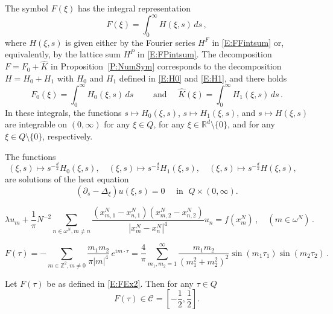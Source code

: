 \documentclass[10pt,a4paper]{amsart}
\let\hat=\widehat
\newcommand\R{{\mathbb R}}
\newcommand\Z{{\mathbb Z}}
\newcommand\cC{{\mathcal{C}}}
\begin{document}
\begin{proposition}
 \label{P:FInt}
 The symbol $F(\xi)$ has the integral representation
\begin{equation}
\label{E:F=intH}
 F(\xi) = \int_{0}^{\infty} H(\xi,s)\,ds\,,
\end{equation}
where $H(\xi,s)$ is given either by the Fourier series $H^{F}$ in \eqref{E:FFintsum} or, equivalently, by the lattice sum $H^{P}$ in \eqref{E:FPintsum}.  
The decomposition $F=F_{0}+\hat K$ in Proposition~\ref{P:NumSym} corresponds to the decomposition $H=H_{0}+H_{1}$ with $H_{0}$ and $H_{1}$ defined in \eqref{E:H0} and \eqref{E:H1}, and there holds
\begin{equation}
\label{E:F01Int}
F_{0}(\xi) = \int_{0}^{\infty} H_{0}(\xi,s)\,ds \qquad
\mbox{ and }\quad
\hat K(\xi) = \int_{0}^{\infty} H_{1}(\xi,s)\,ds \,.
\end{equation}
In these integrals, the functions $s\mapsto H_{0}(\xi,s)$, $s\mapsto H_{1}(\xi,s)$, and $s\mapsto H(\xi,s)$ are integrable on $(0,\infty)$ for any $\xi\in Q$, for any $\xi\in\R^{d}\setminus\{0\}$, and for any $\xi\in Q\setminus\{0\}$, respectively.
\end{proposition}

\begin{lemma}
The functions
 \label{L:heat}
$$
 (\xi,s)\mapsto s^{-\frac d2}H_{0}(\xi,s),\quad
 (\xi,s)\mapsto s^{-\frac d2}H_{1}(\xi,s),\quad
 (\xi,s)\mapsto s^{-\frac d2}H(\xi,s),\quad
$$
are solutions of the heat equation 
$$
(\partial_{s}-\Delta_{\xi})u(\xi,s)=0\quad\mbox{ in }\; Q\times(0,\infty).
$$
\end{lemma}

\begin{equation}
\label{E:DDA2dEx2}
 \lambda u_{m} + \frac{1}{\pi} N^{-2}
 \sum_{n\in\omega^{N},m\ne n} 
 \frac{(x^{N}_{m,1}-x^{N}_{n,1})(x^{N}_{m,2}-x^{N}_{n,2})}{|x^{N}_{m}-x^{N}_{n}|^{4}}
  u_{n}
 = f(x^{N}_{m}) \,,\quad (m\in\omega^{N})\,.
\end{equation}

\begin{equation}
\label{E:FEx2}
 F(\tau) = -\sum_{m\in\Z^{2},m\ne0}\frac{m_{1}m_{2}}{\pi|m|^{4}}\,e^{im\cdot \tau}
  = \frac4\pi \sum_{m_{1},m_{2}=1}^{\infty}
    \frac{m_{1}m_{2}}{(m_{1}^{2}+m_{2}^{2})^{2}}
    \sin(m_{1}\tau_{1}) \sin(m_{2}\tau_{2})
        \,.
\end{equation}

\begin{lemma}
 \label{L:im(Fex2)}
 Let $F(\tau)$ be as defined in \eqref{E:FEx2}. Then for any $\tau\in Q$
\begin{equation}
\label{E:Fpos}
  F(\tau) \in \cC=[-\frac12,\frac12].
\end{equation}
\end{lemma}
\end{document}
